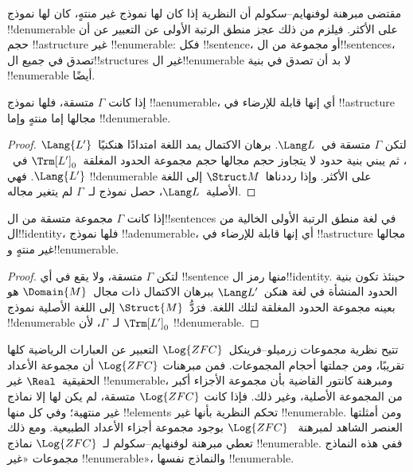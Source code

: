 \documentclass[../../../include/open-logic-section]{subfiles}
\begin{document}

مقتضى مبرهنة لوفنهايم--سكولم أن النظرية إذا كان لها نموذج غير منتهٍ،
كان لها نموذج !!{denumerable} على الأكثر. فيلزم من ذلك عجز منطق
الرتبة الأولى عن التعبير عن أن حجم !!a{structure} غير
!!{enumerable}: فكل !!{sentence}، أو مجموعة من ال!!{sentence}s،
تصدق في جميع ال!!{structure}s غير ال!!{enumerable} لا بد أن
تصدق في بنية !!{enumerable} أيضًا.

\begin{thm}
 إذا كانت $\Gamma$ متسقة، فلها نموذج
!!a{enumerable}، أي إنها قابلة للإرضاء في !!a{structure} مجالها إما
منتهٍ وإما !!{denumerable}.
\end{thm}

\begin{proof}
لتكن $\Gamma$ متسقة في~$\Lang L$. برهان الاكتمال يمد اللغة
امتدادًا هنكنيًا~$\Lang{L'}$، ثم يبني بنية حدود لا يتجاوز حجم
مجالها حجم مجموعة الحدود المغلقة~$\Trm[L']_0$ في~$\Lang{L'}$.
فهي !!{denumerable} على الأكثر. وإذا رددناها~$\Struct M$ إلى
اللغة الأصلية~$\Lang L$، حصل نموذج لـ~$\Gamma$ لم يتغير مجاله.
\end{proof}

\begin{thm}
 إذا كانت $\Gamma$ مجموعة متسقة من ال!!{sentence}s
في لغة منطق الرتبة الأولى الخالية من ال!!{identity}، فلها نموذج
!!a{denumerable}، أي إنها قابلة للإرضاء في !!a{structure} مجالها غير
منتهٍ و!!{enumerable}.
\end{thm}

\begin{proof}
لتكن $\Gamma$ متسقة، ولا يقع في أي !!{sentence} منها رمز
ال!!{identity}. حينئذ تكون بنية الحدود المنشأة في لغة
هنكن~$\Lang L'$ ببرهان الاكتمال ذات مجال~$\Domain{M}$ هو بعينه
مجموعة الحدود المغلقة لتلك اللغة. فرَدُّ~$\Struct{M}$ إلى اللغة
الأصلية نموذج !!{denumerable} لـ~$\Gamma$، لأن
$\Trm[L']_0$ !!{denumerable}.
\end{proof}

\begin{ex}
تتيح نظرية مجموعات زرميلو--فرينكل~$\Log{ZFC}$ التعبير عن العبارات
الرياضية كلها تقريبًا، ومن جملتها أحجام المجموعات. فمن مبرهنات
$\Log{ZFC}$ أن مجموعة الأعداد الحقيقية~$\Real$ غير
!!{enumerable}، ومبرهنة كانتور القاضية بأن مجموعة الأجزاء أكبر من
المجموعة الأصلية، وغير ذلك. فإذا كانت $\Log{ZFC}$ متسقة، لم يكن
لها إلا نماذج غير منتهية؛ وفي كل منها !!{element}s تحكم النظرية
بأنها غير !!{enumerable}. ومن أمثلتها العنصر الشاهد لمبرهنة
~$\Log{ZFC}$ بوجود مجموعة أجزاء الأعداد الطبيعية. ومع ذلك تعطي
مبرهنة لوفنهايم--سكولم لـ~$\Log{ZFC}$ نماذج !!{enumerable}.
ففي هذه النماذج مجموعات «غير !!{enumerable}»، والنماذج نفسها
!!{enumerable}.
\end{ex}
\end{document}
